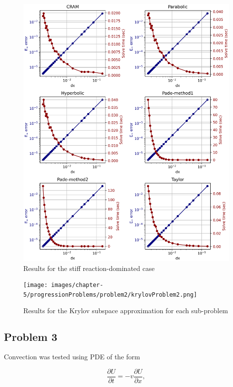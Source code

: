 \begin{figure}[p]
    \centering
    \includegraphics[width=5.0in]{images/chapter-5/progressionProblems/problem2/problem2c.png}
    \caption{Results for the stiff reaction-dominated case}
    \label{fig:problem2_stiff_reaction_dom}
\end{figure}

\clearpage

\begin{figure}
    \centering
    \texttt{[image: images/chapter-5/progressionProblems/problem2/krylovProblem2.png]}
    \caption{Results for the Krylov subspace approximation for each sub-problem}
    \label{fig:problem2_krylov}
\end{figure}

\clearpage

\subsection{Problem 3}

Convection was tested using PDE of the form

\begin{equation}
    \frac{\partial U}{\partial t} = -v\frac{\partial U}{\partial x},
    \label{eq:convection_PDE}
\end{equation}

